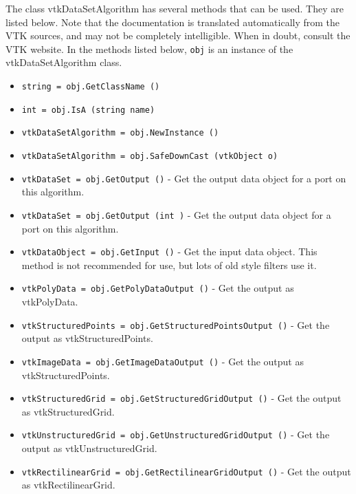 The class vtkDataSetAlgorithm has several methods that can be used.
  They are listed below.
Note that the documentation is translated automatically from the VTK sources,
and may not be completely intelligible.  When in doubt, consult the VTK website.
In the methods listed below, \verb|obj| is an instance of the vtkDataSetAlgorithm class.
\begin{itemize}
\item  \verb|string = obj.GetClassName ()|

\item  \verb|int = obj.IsA (string name)|

\item  \verb|vtkDataSetAlgorithm = obj.NewInstance ()|

\item  \verb|vtkDataSetAlgorithm = obj.SafeDownCast (vtkObject o)|

\item  \verb|vtkDataSet = obj.GetOutput ()| -  Get the output data object for a port on this algorithm.

\item  \verb|vtkDataSet = obj.GetOutput (int )| -  Get the output data object for a port on this algorithm.

\item  \verb|vtkDataObject = obj.GetInput ()| -  Get the input data object. This method is not recommended for use, but
 lots of old style filters use it.

\item  \verb|vtkPolyData = obj.GetPolyDataOutput ()| -  Get the output as vtkPolyData.

\item  \verb|vtkStructuredPoints = obj.GetStructuredPointsOutput ()| -  Get the output as vtkStructuredPoints.

\item  \verb|vtkImageData = obj.GetImageDataOutput ()| -  Get the output as vtkStructuredPoints.

\item  \verb|vtkStructuredGrid = obj.GetStructuredGridOutput ()| -  Get the output as vtkStructuredGrid.

\item  \verb|vtkUnstructuredGrid = obj.GetUnstructuredGridOutput ()| -  Get the output as vtkUnstructuredGrid.

\item  \verb|vtkRectilinearGrid = obj.GetRectilinearGridOutput ()| -  Get the output as vtkRectilinearGrid. 


\end{itemize}
